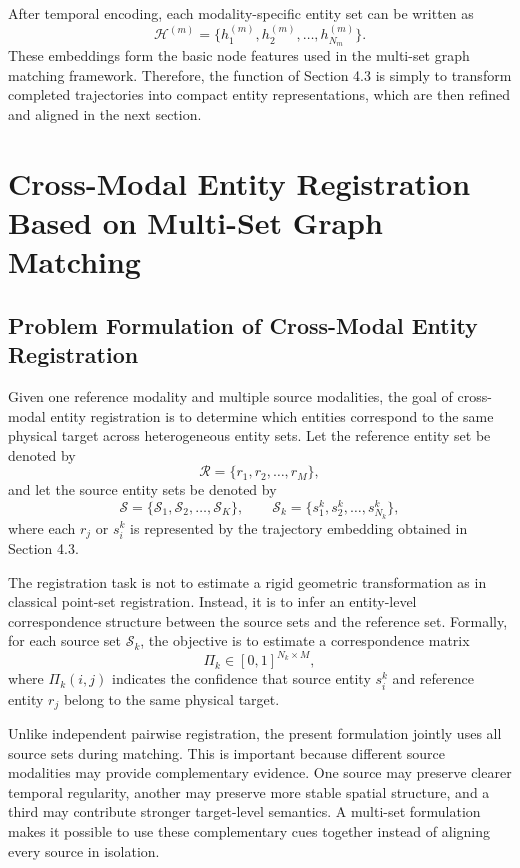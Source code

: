 After temporal encoding, each modality-specific entity set can be written as
\begin{equation}
  \mathcal{H}^{(m)} = \{h_1^{(m)},h_2^{(m)},\ldots,h_{N_m}^{(m)}\}.
\end{equation}
These embeddings form the basic node features used in the multi-set graph matching framework. Therefore, the function of Section 4.3 is simply to transform completed trajectories into compact entity representations, which are then refined and aligned in the next section.

\section{Cross-Modal Entity Registration Based on Multi-Set Graph Matching}

\subsection{Problem Formulation of Cross-Modal Entity Registration}
Given one reference modality and multiple source modalities, the goal of cross-modal entity registration is to determine which entities correspond to the same physical target across heterogeneous entity sets. Let the reference entity set be denoted by
\begin{equation}
  \mathcal{R} = \{r_1,r_2,\ldots,r_M\},
\end{equation}
and let the source entity sets be denoted by
\begin{equation}
  \mathcal{S} = \{\mathcal{S}_1,\mathcal{S}_2,\ldots,\mathcal{S}_K\}, \qquad
  \mathcal{S}_k = \{s^k_1,s^k_2,\ldots,s^k_{N_k}\},
\end{equation}
where each \(r_j\) or \(s^k_i\) is represented by the trajectory embedding obtained in Section 4.3.

The registration task is not to estimate a rigid geometric transformation as in classical point-set registration. Instead, it is to infer an entity-level correspondence structure between the source sets and the reference set. Formally, for each source set \(\mathcal{S}_k\), the objective is to estimate a correspondence matrix
\begin{equation}
  \Pi_k \in [0,1]^{N_k \times M},
\end{equation}
where \(\Pi_k(i,j)\) indicates the confidence that source entity \(s^k_i\) and reference entity \(r_j\) belong to the same physical target.

Unlike independent pairwise registration, the present formulation jointly uses all source sets during matching. This is important because different source modalities may provide complementary evidence. One source may preserve clearer temporal regularity, another may preserve more stable spatial structure, and a third may contribute stronger target-level semantics. A multi-set formulation makes it possible to use these complementary cues together instead of aligning every source in isolation.

